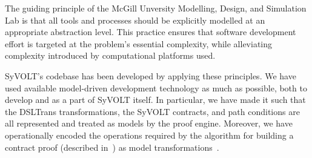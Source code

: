 

The guiding principle of the McGill Unversity Modelling, Design, and Simulation
Lab is that all tools and processes should be explicitly modelled at an
appropriate abstraction level.
This practice ensures that software development effort is targeted at the
problem's essential complexity, while alleviating complexity
introduced by computational platforms used.


SyVOLT's codebase has been developed by applying these principles. We have used
available model-driven development technology as much as possible, both to
develop and as a part of SyVOLT itself. In particular, we have made it such that
the DSLTrans transformations, the SyVOLT contracts, and path conditions are all represented and treated as models by the proof engine.
 Moreover, we have operationally encoded the
 operations required by the algorithm for building a contract proof (described
 in~\cite{Lucio2014}) as model transformations~\cite{LucioVang}.

